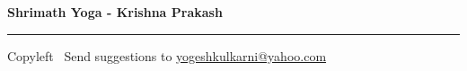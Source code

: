 
\usepackage{polyglossia}
\setdefaultlanguage{sanskrit}

\usepackage{fontspec}
\setmainfont{Segoe UI}

\newfontfamily{}
\newfontfamily{}
\newfontfamily{}
\newfontfamily{}


\newfontfamily{}

\graphicspath{{images/}}



\footnotesize


\begin{center}
\Large{\textbf{Shrimath Yoga - Krishna Prakash}} 
\end{center}

\begin{multicols}{2}

\end{multicols}

\rule{\linewidth}{0.25pt}
\scriptsize
Copyleft \textcopyleft\  Send suggestions to 
\href{http://www.yogeshkulkarni.com}{yogeshkulkarni@yahoo.com}


